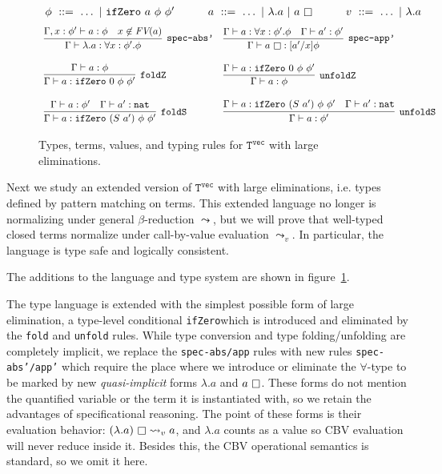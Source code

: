 \documentclass[copyright]{eptcs}
\newcommand{\vc}[0]{\texttt{vec}}
\newcommand{\nat}[0]{\texttt{nat}}
\newcommand{\Tvec}[0]{\texttt{T}^\vc}
\newcommand{\leadstov}[0]{\leadsto_v}
\newcommand{\ifzero}[0]{\texttt{ifZero}}
\newcommand{\impapp}[0]{\raisebox{-0.2ex}{$\square$}}
\begin{document}
\begin{figure}
\[ 
\begin{array}{lll}
\phi\ ::=\ \dots\ |\ \ifzero\ a\ \phi\ \phi' & \qquad a\ ::=\ \dots\ |\ \lambda.a\ |\ a\ \impapp   & \qquad v\ ::=\ \dots\ |\ \lambda.a
\end{array}
\]
\[
\begin{array}{ll}

\infer[\texttt{spec-abs'}]{\Gamma \vdash \lambda.a : \forall x:\phi'.\phi}{\Gamma, x:\phi' \vdash a:\phi & x\not\in\textit{FV}(a)}
&
\infer[\texttt{spec-app'}]{\Gamma \vdash a\ \impapp : [a'/x]\phi}{\Gamma \vdash a:\forall x:\phi'.\phi & \Gamma \vdash a':\phi'}

\\ \\

\infer[\texttt{foldZ}]
{\Gamma\vdash a : \ifzero\ 0\ \phi\ \phi'}
{\Gamma\vdash a : \phi}

&
\infer[\texttt{unfoldZ}]
{\Gamma\vdash a : \phi}
{\Gamma\vdash a : \ifzero\ 0\ \phi\ \phi'}

\\ \\

\infer[\texttt{foldS}]
{\Gamma\vdash a : \ifzero\ (S\ a')\ \phi\ \phi'}
{\Gamma\vdash a : \phi' & \Gamma\vdash a':\nat}

&
\infer[\texttt{unfoldS}]
{\Gamma\vdash a : \phi'}
{\Gamma\vdash a : \ifzero\ (S\ a')\ \phi\ \phi' & \Gamma\vdash a':\nat}
\end{array}
\]
\caption{Types, terms, values, and typing rules for $\Tvec$ with large eliminations.}
\label{fig:tveclarge}
\end{figure}

Next we study an extended version of $\Tvec$ with large eliminations,
i.e. types defined by pattern matching on terms.  This extended
language no longer is normalizing under general $\beta$-reduction
$\leadsto$, but we will prove that well-typed closed terms normalize
under call-by-value evaluation $\leadstov$. In particular, the language is
type safe and logically consistent.

The additions to the language and type system are shown in
figure~\ref{fig:tveclarge}. 

The type language is extended with the simplest possible form of large elimination,
a type-level conditional \ifzero which is introduced and
eliminated by the \texttt{fold} and \texttt{unfold} rules.  While type
conversion and type folding/unfolding are completely implicit, we
replace the \texttt{spec-abs/app} rules with new rules
\texttt{spec-abs'/app'} which require the place where we introduce or
eliminate the $\forall$-type to be marked by new \emph{quasi-implicit}
forms $\lambda.a$ and $a\ \impapp$. These forms do not mention the
quantified variable or the term it is instantiated with, so we retain
the advantages of specificational reasoning. The point of these forms
is their evaluation behavior: $(\lambda.a)\ \impapp \leadstov a$, and
$\lambda.a$ counts as a value so CBV evaluation will never reduce
inside it. Besides this, the CBV operational semantics is standard, so
we omit it here.
\end{document}
